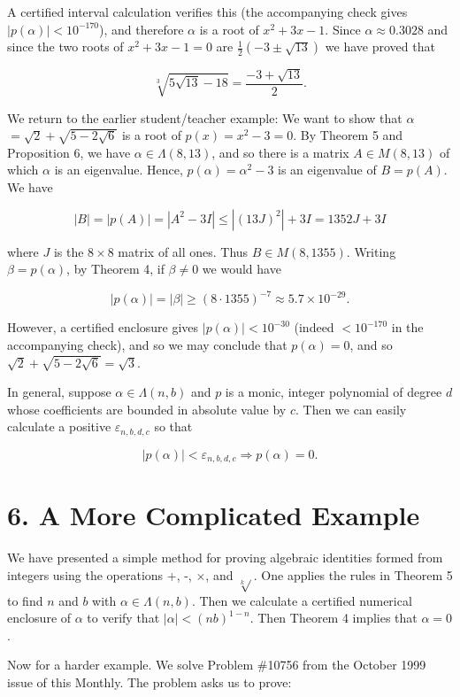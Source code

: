 \documentclass[11pt,letterpaper]{article}
\begin{document}
A certified interval calculation verifies this (the accompanying check gives $|p(\alpha)|<10^{-170}$), and therefore $\alpha$ is a root of $x^{2}+3 x-1$. Since $\alpha \approx 0.3028$ and since the two roots of $x^{2}+3 x-1=0$ are $\frac{1}{2}(-3 \pm \sqrt{13})$ we have proved that

\[
\sqrt[3]{5 \sqrt{13}-18}=\frac{-3+\sqrt{13}}{2} .
\]

We return to the earlier student/teacher example: We want to show that $\alpha$ $=\sqrt{2}+\sqrt{5-2 \sqrt{6}}$ is a root of $p(x)=x^{2}-3=0$. By Theorem 5 and Proposition 6, we have $\alpha \in \Lambda(8,13)$, and so there is a matrix $A \in M(8,13)$ of which $\alpha$ is an eigenvalue. Hence, $p(\alpha)=\alpha^{2}-3$ is an eigenvalue of $B=p(A)$. We have

\[
|B|=|p(A)|=\left|A^{2}-3 I\right| \leq\left|(13 J)^{2}\right|+3 I=1352 J+3 I
\]

where $J$ is the $8 \times 8$ matrix of all ones. Thus $B \in M(8,1355)$. Writing $\beta=p(\alpha)$, by Theorem 4, if $\beta\ne0$ we would have

\[
|p(\alpha)|=|\beta| \geq(8 \cdot 1355)^{-7} \approx 5.7 \times 10^{-29} .
\]

However, a certified enclosure gives $|p(\alpha)|<10^{-30}$ (indeed $<10^{-170}$ in the accompanying check), and so we may conclude that $p(\alpha)=0$, and so $\sqrt{2}+\sqrt{5-2 \sqrt{6}}=\sqrt{3}$.

In general, suppose $\alpha \in \Lambda(n, b)$ and $p$ is a monic, integer polynomial of degree $d$ whose coefficients are bounded in absolute value by $c$. Then we can easily calculate a positive $\varepsilon_{n, b, d, c}$ so that

\[
|p(\alpha)|<\varepsilon_{n, b, d, c} \Rightarrow p(\alpha)=0 .
\]

\section*{6. A More Complicated Example} We have presented a simple method for proving algebraic identities formed from integers using the operations +, -, $\times$, and $\sqrt[k]{ }$. One applies the rules in Theorem 5 to find $n$ and $b$ with $\alpha \in \Lambda(n, b)$. Then we calculate a certified numerical enclosure of $\alpha$ to verify that $|\alpha|<(n b)^{1-n}$. Then Theorem 4 implies that $\alpha=0$.


Now for a harder example. We solve Problem \#10756 from the October 1999 issue of this Monthly. The problem asks us to prove:
\end{document}
